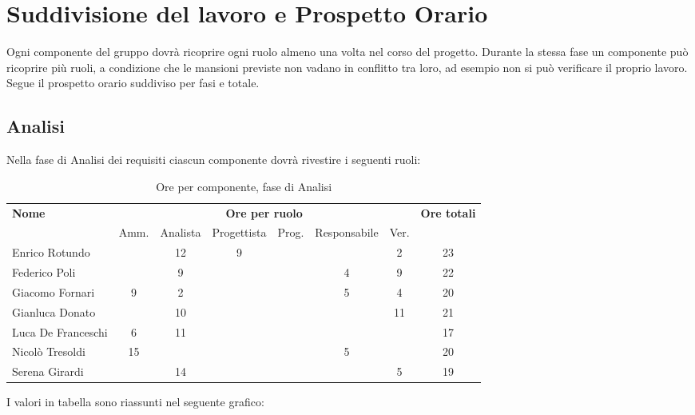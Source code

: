 \section{Suddivisione del lavoro e Prospetto Orario} 


Ogni componente del gruppo dovrà ricoprire ogni ruolo almeno una volta nel corso del progetto.
Durante la stessa fase un componente può ricoprire più ruoli, a condizione che le mansioni previste non vadano in conflitto tra loro, ad esempio non si può verificare il proprio lavoro.
Segue il prospetto orario suddiviso per fasi e totale. \\

\subsection{Analisi}

Nella fase di Analisi dei requisiti ciascun componente dovrà rivestire i seguenti ruoli:
\begin{table}[H]
\centering
\begin{tabular}{lccccccc}
\toprule 
    \textbf{Nome}  & \multicolumn{6}{c}{\textbf{Ore per ruolo}} & \textbf{Ore totali} \\
     & Amm. & Analista & Progettista & Prog. & Responsabile & Ver. \\
    \midrule
    Enrico Rotundo 		&   & 12 & 9 &  &  & 2 & 23 \\
    Federico Poli 		&   & 9 &  &  & 4 & 9 & 22 \\
    Giacomo Fornari		& 9 & 2 & 	&  & 5 & 4 & 20 \\
    Gianluca Donato 		&   & 10 &  &  &  & 11 & 21 \\
    Luca De Franceschi  & 6 & 11 &  &  &  &  & 17 \\
    Nicolò Tresoldi 		& 15&  &  &  & 5 &  & 20 \\
   	Serena Girardi 		&   & 14 &  &  &  & 5 & 19 \\
    
    \bottomrule
\end{tabular}
\caption{Ore per componente, fase di Analisi}
\end{table}

I valori in tabella sono riassunti nel seguente grafico: \\ 

